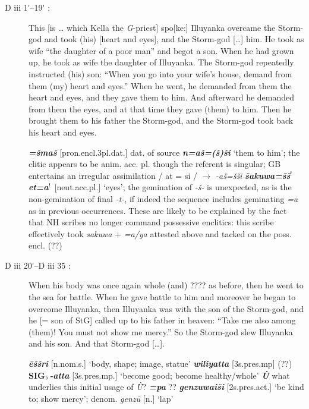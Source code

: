 \documentclass[10pt]{article}
\newcommand{\supersc}[1]{$^{\textrm{\scriptsize{#1}}}$}  	%
\newcommand{\subsc}[1]{$_{\textrm{\scriptsize{#1}}}$}	%
\newcommand{\bit}[1]{\textbf{\textit{#1}}}				%
\newcommand{\p}[1]{{\tiny[{#1}]}}					%
\newcommand{\pr}{\'{ }}									%
\renewcommand{\.}[1]{\textsubdot{#1}}
\begin{document}
\begin{description}

\item[D iii 1{\pr}--19{\pr} :] This [is {\ldots} which Kella the \textit{G}-priest] spo[ke:] Illuyanka overcame the Storm-god and took (his) [heart and eyes], and the Storm-god [{\ldots}] him. He took as wife ``the daughter of a poor man'' and begot a son. When he had grown up, he took as wife the daughter of Illuyanka. The Storm-god repeatedly instructed (his) son: ``When you go into your wife's house, demand from them (my) heart and eyes.'' When he went, he demanded from them the heart and eyes, and they gave them to him. And afterward he demanded from them the eyes, and at that time they gave (them) to him. Then he brought them to his father the Storm-god,  and the Storm-god took back his heart and eyes.

\begin{notes}

\bit{=\v{s}ma\v{s}} \p{pron.encl.3pl.dat.} dat. of source \bit{n=a\v{s}=(\v{s})\v{s}i} `them to him'; the clitic appears to be anim. acc. pl. though the referent is singular; GB entertains an irregular assimilation / at = si / $\rightarrow$ \textit{-a\v{s}=\v{s}\v{s}i} \bit{\v{s}akuwa=\v{s}\v{s}\supersc{!}et=a\supersc{!}} \p{neut.acc.pl.} `eyes'; the gemination of \textit{-\v{s}-} is unexpected, as is the non-gemination of final \textit{-t-}, if indeed the sequence includes geminating \textit{=a} as in previous occurrences. These are likely to be explained by the fact that NH scribes no longer command possessive enclitics: this scribe effectively took \textit{sakuwa} + \textit{=a/ya} attested above and tacked on the poss. encl. (??) 

\end{notes}

\item[D iii 20{\pr}--D iii 35 :] When his body was once again whole (and) ???? as before, then he went to the sea for battle. When he gave battle to him and moreover he began to overcome Illuyanka, then Illuyanka was with the son of the Storm-god, and he [= son of StG] called up to his father in heaven: ``Take me also among (them)! You must not show me mercy.'' So the Storm-god slew Illuyanka and his son. And that Storm-god [{\ldots}].

\begin{notes}

\bit{\=e\v{s}\v{s}ri} \p{n.nom.s.} `body, shape; image, statue' \bit{wiliyatta} \p{3s.pres.mp} (??) \textbf{SIG\subsc{5}}\bit{-atta} \p{3s.pres.mp.} `become good; become healthy/whole' \bit{\`U} what underlies this initial usage of \textit{\`U}? \bit{=pa} ?? \bit{genzuwai\v{s}i} \p{2s.pres.act.} `be kind to; show mercy'; denom. \textit{genz\=u} \p{n.} `lap'



\end{notes}
\end{description}
\end{document}

